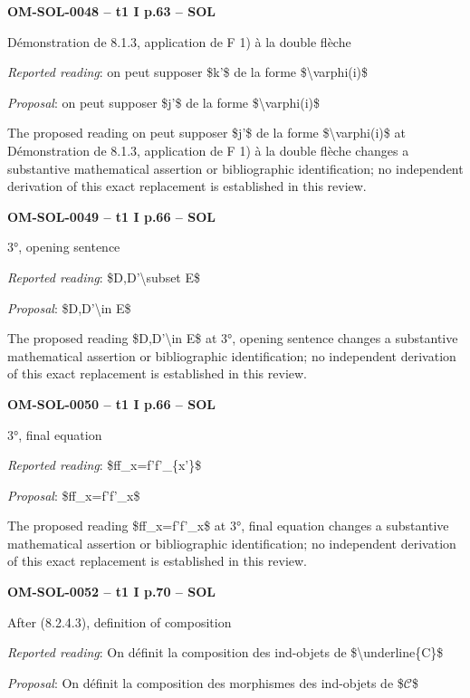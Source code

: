 \par\noindent\textbf{OM-SOL-0048 -- t1 I p.63 -- SOL}\par
Démonstration de 8.1.3, application de F 1) à la double flèche\par
\emph{Reported reading}: on peut supposer \$k'\$ de la forme \$\textbackslash{}varphi(i)\$\par
\emph{Proposal}: on peut supposer \$j'\$ de la forme \$\textbackslash{}varphi(i)\$\par
The proposed reading on peut supposer \$j'\$ de la forme \$\textbackslash{}varphi(i)\$ at Démonstration de 8.1.3, application de F 1) à la double flèche changes a substantive mathematical assertion or bibliographic identification; no independent derivation of this exact replacement is established in this review.\par
\par\noindent\textbf{OM-SOL-0049 -- t1 I p.66 -- SOL}\par
3°, opening sentence\par
\emph{Reported reading}: \$D,D'\textbackslash{}subset E\$\par
\emph{Proposal}: \$D,D'\textbackslash{}in E\$\par
The proposed reading \$D,D'\textbackslash{}in E\$ at 3°, opening sentence changes a substantive mathematical assertion or bibliographic identification; no independent derivation of this exact replacement is established in this review.\par
\par\noindent\textbf{OM-SOL-0050 -- t1 I p.66 -- SOL}\par
3°, final equation\par
\emph{Reported reading}: \$ff\_x=\allowbreak f'f'\_\{x'\}\$\par
\emph{Proposal}: \$ff\_x=\allowbreak f'f'\_x\$\par
The proposed reading \$ff\_x=\allowbreak f'f'\_x\$ at 3°, final equation changes a substantive mathematical assertion or bibliographic identification; no independent derivation of this exact replacement is established in this review.\par
\par\noindent\textbf{OM-SOL-0052 -- t1 I p.70 -- SOL}\par
After (8.2.4.3), definition of composition\par
\emph{Reported reading}: On définit la composition des ind-objets de \$\textbackslash{}underline\{C\}\$\par
\emph{Proposal}: On définit la composition des morphismes des ind-objets de \$\ensuremath{𝒞}\$\par
